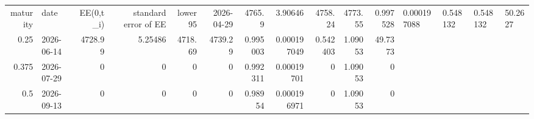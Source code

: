 \begin{tabular}{rlrrrrrrrrr}
\toprule
maturity & date & EE(0,t_i) & standard error of EE & lower 95%
 & 2026-04-29 & 4765.9 & 3.90646 & 4758.24 & 4773.55 & 0.997528 & 0.000197088 & 0.548132 & 0.548132 & 50.2627 \\
0.25 & 2026-06-14 & 4728.99 & 5.25486 & 4718.69 & 4739.29 & 0.995003 & 0.000197049 & 0.542403 & 1.09053 & 49.7373 \\
0.375 & 2026-07-29 & 0 & 0 & 0 & 0 & 0.992311 & 0.00019701 & 0 & 1.09053 & 0 \\
0.5 & 2026-09-13 & 0 & 0 & 0 & 0 & 0.98954 & 0.000196971 & 0 & 1.09053 & 0 \\
\bottomrule
\end{tabular}
